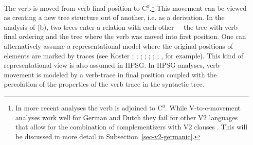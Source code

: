 {The verb is moved from verb-final position to C$^0$.\footnote{
  In more recent analyses the verb is adjoined to C$^0$. While V-to-c-movement analyses work well for German and
  Dutch they fail for other V2 languages that allow for the combination of complementizers
  with V2 clauses \citep{Fanselow2009b}. This will be discussed in more detail in
  Subsection~\ref{sec-v2-germanic}.
} This movement can be viewed as creating a new tree structure out
of another, i.e. as a derivation. In the analysis of (b), two trees enter a relation with each other $-$ the
tree with verb-final ordering and the tree where the verb was moved into first position. One can alternatively assume a 
representational model where the original positions of elements are marked by traces (see %
Koster \citeyear[\page ]{Koster78b-u}; \citeyear[]{Koster87a-u}; 
\citealp{KT91a}; \citealp[Section~1.4]{Haider93a}; 
\citealp[]{Frey93a}; \citealp[--88, 177--178]{Lohnstein93a-u}; \citealp[]{FC94a}; \citealp[]{Veenstra98a}, for example). This kind of representational view 
is also assumed in HPSG. In HPSG analyses, verb-movement is modeled by a verb-trace in final position coupled with the percolation of
the properties of the verb trace in the syntactic tree. 

}
